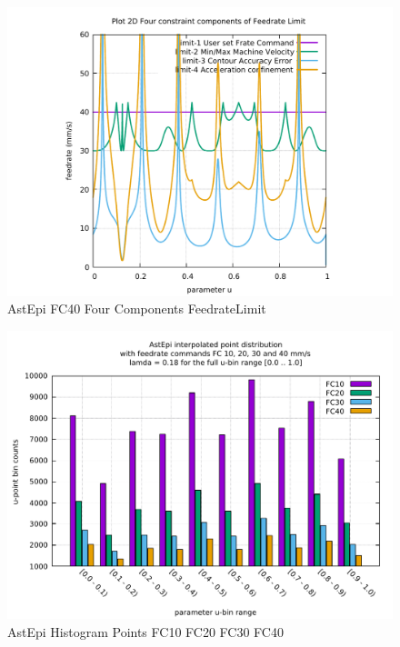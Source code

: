 \begin{figure}
	\caption     {AstEpi FC40 Four Components FeedrateLimit}
	\label{34-img-AstEpi-FC40-Four-Components-FeedrateLimit.pdf}
\includegraphics[width=1.00\textwidth]{Chap4/appendix/app-AstEpi/plots/34-img-AstEpi-FC40-Four-Components-FeedrateLimit.pdf}
\end{figure}


\clearpage
\pagebreak

\begin{figure}
	\centering
	\caption     {AstEpi Histogram Points FC10 FC20 FC30 FC40}
	\label{35-img-AstEpi-Histogram-Points-FC10-FC20-FC30-FC40.pdf}
\includegraphics[width=1.00\textwidth]{Chap4/appendix/app-AstEpi/plots/35-img-AstEpi-Histogram-Points-FC10-FC20-FC30-FC40.pdf} 
\end{figure}


